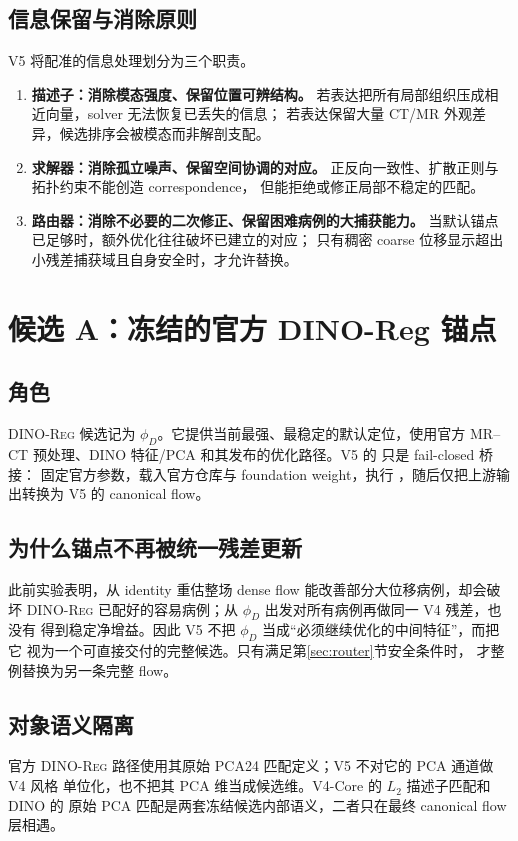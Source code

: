 \documentclass[11pt,a4paper]{ctexart}
\newcommand{\Dino}{\textsc{DINO-Reg}}
\begin{document}
\subsection{信息保留与消除原则}
V5 将配准的信息处理划分为三个职责。
\begin{enumerate}
  \item \textbf{描述子：消除模态强度、保留位置可辨结构。}
        若表达把所有局部组织压成相近向量，solver 无法恢复已丢失的信息；
        若表达保留大量 CT/MR 外观差异，候选排序会被模态而非解剖支配。
  \item \textbf{求解器：消除孤立噪声、保留空间协调的对应。}
        正反向一致性、扩散正则与拓扑约束不能创造 correspondence，
        但能拒绝或修正局部不稳定的匹配。
  \item \textbf{路由器：消除不必要的二次修正、保留困难病例的大捕获能力。}
        当默认锚点已足够时，额外优化往往破坏已建立的对应；
        只有稠密 coarse 位移显示超出小残差捕获域且自身安全时，才允许替换。
\end{enumerate}

\section{候选 A：冻结的官方 DINO-Reg 锚点}

\subsection{角色}
\Dino{} 候选记为 $\phi_D$。它提供当前最强、最稳定的默认定位，使用官方
MR--CT 预处理、DINO 特征/PCA 和其发布的优化路径。V5 的
 只是 fail-closed 桥接：
固定官方参数，载入官方仓库与 foundation weight，执行
，随后仅把上游输出转换为 V5 的 canonical flow。

\subsection{为什么锚点不再被统一残差更新}
此前实验表明，从 identity 重估整场 dense flow 能改善部分大位移病例，却会破坏
\Dino{} 已配好的容易病例；从 $\phi_D$ 出发对所有病例再做同一 V4 残差，也没有
得到稳定净增益。因此 V5 不把 $\phi_D$ 当成“必须继续优化的中间特征”，而把它
视为一个可直接交付的完整候选。只有满足第\ref{sec:router}节安全条件时，
才整例替换为另一条完整 flow。

\subsection{对象语义隔离}
官方 \Dino{} 路径使用其原始 PCA24 匹配定义；V5 不对它的 PCA 通道做 V4 风格
单位化，也不把其 PCA 维当成候选维。V4-Core 的 $L_2$ 描述子匹配和 DINO 的
原始 PCA 匹配是两套冻结候选内部语义，二者只在最终 canonical flow 层相遇。
\end{document}
